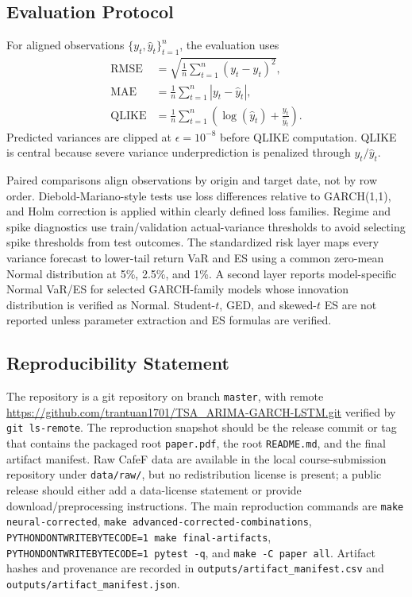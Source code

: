 \subsection{Evaluation Protocol}

For aligned observations \(\{y_t,\hat{y}_t\}_{t=1}^n\), the evaluation uses
\begin{align}
\mathrm{RMSE} &= \sqrt{\frac{1}{n}\sum_{t=1}^{n}(y_t-\hat{y}_t)^2},\\
\mathrm{MAE} &= \frac{1}{n}\sum_{t=1}^{n}|y_t-\hat{y}_t|,\\
\mathrm{QLIKE} &= \frac{1}{n}\sum_{t=1}^{n}\left(\log(\hat{y}_t)+\frac{y_t}{\hat{y}_t}\right).
\end{align}
Predicted variances are clipped at \(\epsilon=10^{-8}\) before QLIKE computation. QLIKE is central because severe variance underprediction is penalized through \(y_t/\hat{y}_t\).

Paired comparisons align observations by origin and target date, not by row order. Diebold-Mariano-style tests use loss differences relative to GARCH(1,1), and Holm correction is applied within clearly defined loss families. Regime and spike diagnostics use train/validation actual-variance thresholds to avoid selecting spike thresholds from test outcomes. The standardized risk layer maps every variance forecast to lower-tail return VaR and ES using a common zero-mean Normal distribution at 5\%, 2.5\%, and 1\%. A second layer reports model-specific Normal VaR/ES for selected GARCH-family models whose innovation distribution is verified as Normal. Student-\(t\), GED, and skewed-\(t\) ES are not reported unless parameter extraction and ES formulas are verified.

\subsection{Reproducibility Statement}

The repository is a git repository on branch \texttt{master}, with remote \url{https://github.com/trantuan1701/TSA_ARIMA-GARCH-LSTM.git} verified by \texttt{git ls-remote}. The reproduction snapshot should be the release commit or tag that contains the packaged root \texttt{paper.pdf}, the root \texttt{README.md}, and the final artifact manifest. Raw CafeF data are available in the local course-submission repository under \texttt{data/raw/}, but no redistribution license is present; a public release should either add a data-license statement or provide download/preprocessing instructions. The main reproduction commands are \texttt{make neural-corrected}, \texttt{make advanced-corrected-combinations}, \texttt{PYTHONDONTWRITEBYTECODE=1 make final-artifacts}, \texttt{PYTHONDONTWRITEBYTECODE=1 pytest -q}, and \texttt{make -C paper all}. Artifact hashes and provenance are recorded in \texttt{outputs/artifact\_manifest.csv} and \texttt{outputs/artifact\_manifest.json}.

